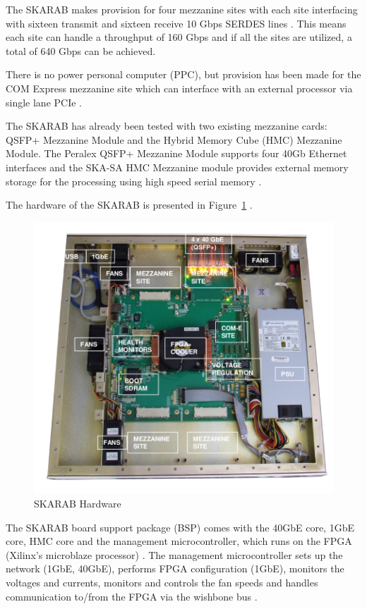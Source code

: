 \documentclass{ws-jai}
\begin{document}
The SKARAB makes provision for four mezzanine sites with each site interfacing with sixteen transmit and sixteen receive 10 Gbps SERDES lines \cite{cliff16}. This means each site can handle a throughput of 160 Gbps and if all the sites are utilized, a total of 640 Gbps can be achieved.

There is no power personal computer (PPC), but provision has been made for the COM Express mezzanine site which can interface with an external processor via single lane PCIe \cite{Teag15}.

The SKARAB has already been tested with two existing mezzanine cards: QSFP+ Mezzanine Module and the Hybrid Memory Cube (HMC) Mezzanine Module. The Peralex QSFP+ Mezzanine Module supports four 40Gb Ethernet interfaces and the SKA-SA HMC Mezzanine module provides external memory storage for the processing using high speed serial memory \cite{cliff16}.

The hardware of the SKARAB is presented in Figure~\ref{fig:skarab_hw} \cite{cliff16}.

\begin{figure}[h]
\centering
\includegraphics[width=150mm, scale=0.5]{skarab_hw}
\caption{SKARAB Hardware}
\label{fig:skarab_hw}
\end{figure}

The SKARAB board support package (BSP) comes with the 40GbE core, 1GbE core, HMC core and the management microcontroller, which runs on the FPGA (Xilinx's microblaze processor) \cite{cliff16}. The management microcontroller sets up the network (1GbE, 40GbE), performs FPGA configuration (1GbE), monitors the voltages and currents, monitors and controls the fan speeds and handles communication to/from the FPGA via the wishbone bus \cite{cliff16} \cite{Teagu15}.
\end{document}

